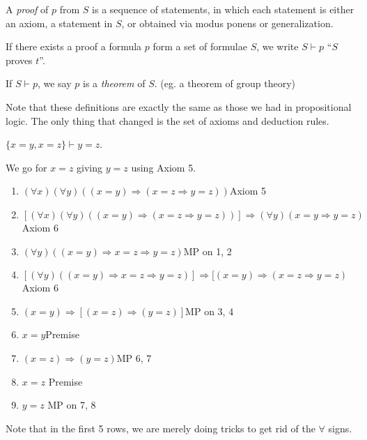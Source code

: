 \documentclass[a4paper]{article}
\begin{document}
\begin{defi}[Proof]
  A \emph{proof} of $p$ from $S$ is a sequence of statements, in which each statement is either an axiom, a statement in $S$, or obtained via modus ponens or generalization.
\end{defi}
\begin{defi}
  If there exists a proof a formula $p$ form a set of formulae $S$, we write $S\vdash p$ ``$S$ proves $t$''.
\end{defi}

\begin{defi}[Theorem]
  If $S\vdash p$, we say $p$ is a \emph{theorem} of $S$. (eg. a theorem of group theory)
\end{defi}

Note that these definitions are exactly the same as those we had in propositional logic. The only thing that changed is the set of axioms and deduction rules.

\begin{eg}
  $\{x = y, x = z\}\vdash y = z$.

  We go for $x = z$ giving $y = z$ using Axiom 5.

  \begin{enumerate}[label=\arabic{*}.]
    \item $(\forall x)(\forall y)((x = y)\Rightarrow (x = z\Rightarrow y=z))$\hfill Axiom 5
    \item $[(\forall x)(\forall y)((x = y)\Rightarrow (x = z\Rightarrow y=z))]\Rightarrow (\forall y)(x = y\Rightarrow y = z)$ \hfill Axiom 6
    \item $(\forall y)((x = y) \Rightarrow x = z \Rightarrow y = z)$\hfill MP on 1, 2
    \item $[(\forall y)((x = y) \Rightarrow x = z \Rightarrow y = z)]\Rightarrow [(x = y)\Rightarrow (x = z\Rightarrow y = z)$\hfill Axiom 6
    \item $(x = y) \Rightarrow [(x = z) \Rightarrow (y = z)]$\hfill MP on 3, 4
    \item $x = y$\hfill Premise
    \item $(x = z) \Rightarrow (y = z)$\hfill MP 6, 7
    \item $x = z$ \hfill Premise
    \item $y = z$ \hfill MP on 7, 8
  \end{enumerate}

  Note that in the first 5 rows, we are merely doing tricks to get rid of the $\forall$ signs.
\end{eg}
\end{document}
